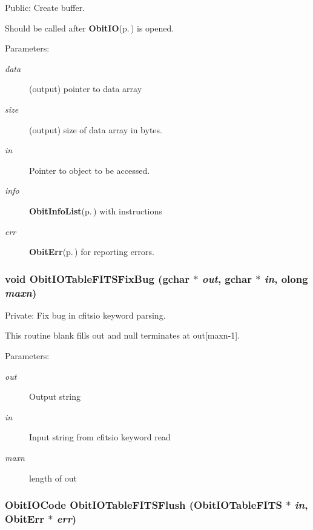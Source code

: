 Public: Create buffer. 

Should be called after {\bf Obit\-IO}{\rm (p.\,\pageref{structObitIO})} is opened. \begin{Desc}
\item[Parameters:]
\begin{description}
\item[{\em data}](output) pointer to data array \item[{\em size}](output) size of data array in bytes. \item[{\em in}]Pointer to object to be accessed. \item[{\em info}]{\bf Obit\-Info\-List}{\rm (p.\,\pageref{structObitInfoList})} with instructions \item[{\em err}]{\bf Obit\-Err}{\rm (p.\,\pageref{structObitErr})} for reporting errors. \end{description}
\end{Desc}
\subsubsection{\setlength{\rightskip}{0pt plus 5cm}void Obit\-IOTable\-FITSFix\-Bug (gchar $\ast$ {\em out}, gchar $\ast$ {\em in}, {\bf olong} {\em maxn})}\label{ObitIOTableFITS_8c_a8}


Private: Fix bug in cfitsio keyword parsing. 

This routine blank fills out and null terminates at out[maxn-1]. \begin{Desc}
\item[Parameters:]
\begin{description}
\item[{\em out}]Output string \item[{\em in}]Input string from cfitsio keyword read \item[{\em maxn}]length of out \end{description}
\end{Desc}
\subsubsection{\setlength{\rightskip}{0pt plus 5cm}Obit\-IOCode Obit\-IOTable\-FITSFlush ({\bf Obit\-IOTable\-FITS} $\ast$ {\em in}, {\bf Obit\-Err} $\ast$ {\em err})}\label{ObitIOTableFITS_8c_a29}


